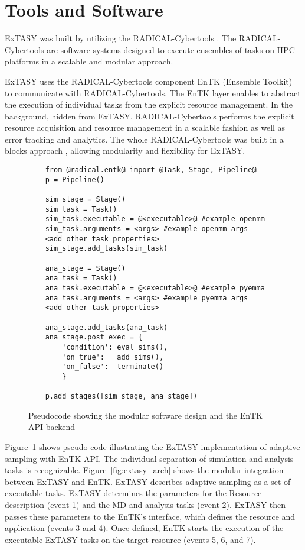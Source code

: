 {\section{\label{sec:Tools}Tools and Software}

ExTASY was built by utilizing the RADICAL-Cybertools \cite{Balasubramanian2019rct}. The RADICAL-Cybertools are software systems designed to execute ensembles of tasks on HPC platforms in a scalable and modular approach.

ExTASY uses the RADICAL-Cybertools component EnTK (Ensemble Toolkit)
\cite{entk-icpp-2016, balasubramanian2018harnessing} to communicate with RADICAL-Cybertools. The EnTK layer enables to abstract the execution of individual tasks from the explicit resource
management. In the background, hidden from ExTASY, RADICAL-Cybertools performs the explicit resource acquisition and resource management in a scalable fashion as well as error tracking and analytics. The whole RADICAL-Cybertools was built in a blocks approach \cite{turilli2018building}, allowing modularity and flexibility for ExTASY.


\begin{figure}[h!]
    \begin{lstlisting}
    from @radical.entk@ import @Task, Stage, Pipeline@
    p = Pipeline()

    sim_stage = Stage()   
    sim_task = Task()
    sim_task.executable = @<executable>@ #example openmm
    sim_task.arguments = <args> #example openmm args
    <add other task properties>
    sim_stage.add_tasks(sim_task)
    
    ana_stage = Stage()
    ana_task = Task()
    ana_task.executable = @<executable>@ #example pyemma
    ana_task.arguments = <args> #example pyemma args
    <add other task properties>
    
    ana_stage.add_tasks(ana_task)
    ana_stage.post_exec = {
        'condition': eval_sims(),
        'on_true':   add_sims(),
        'on_false':  terminate()
        }
    
    p.add_stages([sim_stage, ana_stage])
    \end{lstlisting}
    \caption{Pseudocode showing the modular software design and the EnTK API backend}\label{extasy_snippet}
\end{figure}


Figure~\ref{extasy_snippet} shows pseudo-code illustrating the ExTASY implementation of adaptive sampling with EnTK API. The individual separation of simulation and analysis tasks is recognizable. Figure~\ref{fig:extasy_arch} shows the modular integration between ExTASY and EnTK. ExTASY describes adaptive sampling as a set of executable tasks. ExTASY determines the parameters for the Resource description (event 1) and the MD and analysis tasks (event 2). ExTASY then passes these parameters to the EnTK's interface, which defines the resource and application (events 3 and 4). Once defined, EnTK starts the execution of the executable ExTASY tasks on the target resource (events 5, 6, and 7). 

}
